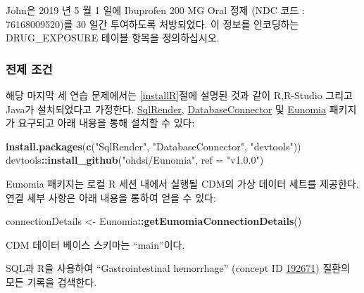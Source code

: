 \documentclass[11pt]{book}
\newenvironment{Shaded}{\begin{snugshade}}{\end{snugshade}}
\newcommand{\KeywordTok}[1]{\textcolor[rgb]{0.13,0.29,0.53}{\textbf{#1}}}
\newcommand{\DataTypeTok}[1]{\textcolor[rgb]{0.13,0.29,0.53}{#1}}
\newcommand{\StringTok}[1]{\textcolor[rgb]{0.31,0.60,0.02}{#1}}
\newcommand{\OperatorTok}[1]{\textcolor[rgb]{0.81,0.36,0.00}{\textbf{#1}}}
\newcommand{\NormalTok}[1]{#1}
\theoremstyle{definition}
\theoremstyle{definition}
\theoremstyle{definition}
\theoremstyle{remark}
\let\BeginKnitrBlock\begin \let\EndKnitrBlock\end
\begin{document}
\BeginKnitrBlock{exercise}
\protect\hypertarget{exr:exerciseJohnDrug}{}{\label{exr:exerciseJohnDrug}
}John은 2019 년 5 월 1 일에 Ibuprofen 200 MG Oral 정제 (NDC 코드 :
76168009520)를 30 일간 투여하도록 처방되었다. 이 정보를 인코딩하는
DRUG\_EXPOSURE 테이블 항목을 정의하십시오.
\EndKnitrBlock{exercise}

\subsubsection*{전제 조건}\label{--1}

해당 마지막 세 연습 문제에서는 \ref{installR}절에 설명된 것과 같이
R,R-Studio 그리고 Java가 설치되었다고 가정한다.
\href{https://ohdsi.github.io/SqlRender/}{SqlRender},
\href{https://ohdsi.github.io/DatabaseConnector/}{DatabaseConnector} 및
\href{https://ohdsi.github.io/Eunomia/}{Eunomia} 패키지가 요구되고 아래
내용을 통해 설치할 수 있다:

\begin{Shaded}
\begin{Highlighting}[]
\KeywordTok{install.packages}\NormalTok{(}\KeywordTok{c}\NormalTok{(}\StringTok{"SqlRender"}\NormalTok{, }\StringTok{"DatabaseConnector"}\NormalTok{, }\StringTok{"devtools"}\NormalTok{))}
\NormalTok{devtools}\OperatorTok{::}\KeywordTok{install_github}\NormalTok{(}\StringTok{"ohdsi/Eunomia"}\NormalTok{, }\DataTypeTok{ref =} \StringTok{"v1.0.0"}\NormalTok{)}
\end{Highlighting}
\end{Shaded}

Eunomia 패키지는 로컬 R 세션 내에서 실행될 CDM의 가상 데이터 세트를
제공한다. 연결 세부 사항은 아래 내용을 통하여 얻을 수 있다:

\begin{Shaded}
\begin{Highlighting}[]
\NormalTok{connectionDetails <-}\StringTok{ }\NormalTok{Eunomia}\OperatorTok{::}\KeywordTok{getEunomiaConnectionDetails}\NormalTok{()}
\end{Highlighting}
\end{Shaded}

CDM 데이터 베이스 스키마는 ``main''이다.

\BeginKnitrBlock{exercise}
\protect\hypertarget{exr:exerciseGiBleedRecords}{}{\label{exr:exerciseGiBleedRecords}
}SQL과 R을 사용하여 ``Gastrointestinal hemorrhage'' (concept ID
\href{http://athena.ohdsi.org/search-terms/terms/192671}{192671}) 질환의
모든 기록을 검색한다.
\EndKnitrBlock{exercise}
\end{document}
